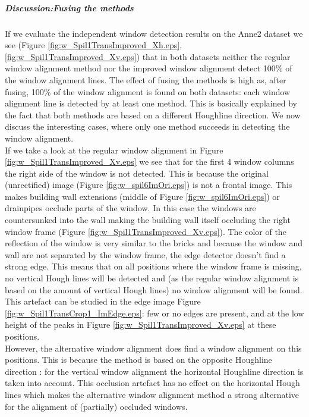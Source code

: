 \subparagraph{Discussion:Fusing the methods}
If we evaluate the independent window detection results on the Anne2 dataset we see (Figure
\ref{fig:w_Spil1TransImproved_Xh.eps}, \ref{fig:w_Spil1TransImproved_Xv.eps})
that in both datasets neither the regular window alignment method nor the
improved window alignment detect 100\% of the window alignment lines.  The
effect of fusing the methods is high as, after fusing, 100\% of the window
alignment is found on both datasets: each window alignment line is detected by
at least one method.  This is basically explained by the fact that both methods
are based on a different Houghline direction.  We now discuss the interesting
cases, where only one method succeeds in detecting the window alignment.\\

\label{lab:occlusion} If we take a look at the regular window alignment in
Figure \ref{fig:w_Spil1TransImproved_Xv.eps} we see that for the first 4 window
columns the right side of the window is not detected.  This is because the
original (unrectified) image (Figure \ref{fig:w_spil6ImOri.eps}) is not a
frontal image.  This makes building wall extensions (middle of Figure
\ref{fig:w_spil6ImOri.eps}) or drainpipes occlude parts of the window.  In this
case the windows are countersunked into the wall making the building wall itself
occluding the right window frame (Figure \ref{fig:w_Spil1TransImproved_Xv.eps}).
The color of the reflection of the window is very similar to the bricks and
because the window and wall are not separated by the window frame, the edge
detector doesn't find a strong edge.  This means that on all positions where the
window frame is missing, no vertical Hough lines will be detected and (as the
regular window alignment is based on the amount of vertical Hough lines) no window
alignment will be found.  This artefact can be studied in the edge image Figure
\ref{fig:w_Spil1TransCrop1_ImEdge.eps}: few or no edges are present, and at the
low height of the peaks in Figure \ref{fig:w_Spil1TransImproved_Xv.eps} at these
positions.\\

However, the alternative window alignment does find a window alignment on this
positions. This is because the method is based on the opposite Houghline
direction : for the vertical window alignment the horizontal Houghline direction
is taken into account.  This occlusion artefact has no effect on the horizontal
Hough lines which makes the alternative window alignment method a strong
alternative for the alignment of (partially) occluded windows.\\

